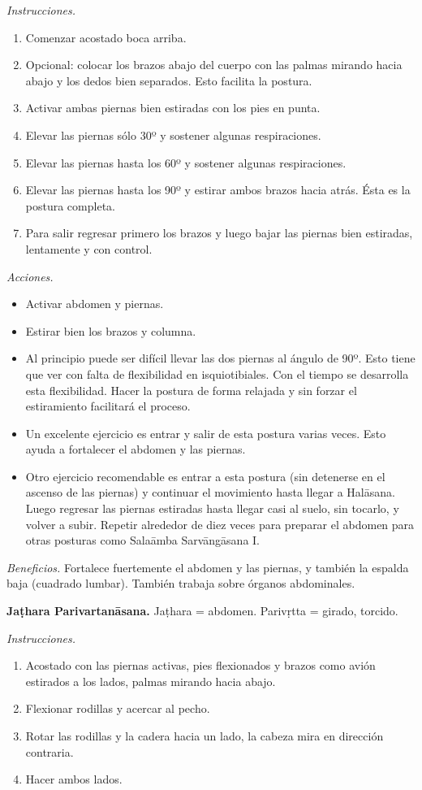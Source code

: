 \emph{Instrucciones.}
\begin{enumerate}
\item Comenzar acostado boca arriba.
\item Opcional: colocar los brazos abajo del
cuerpo con las palmas mirando hacia abajo y
los dedos bien separados. Esto facilita la
postura.
\item Activar ambas piernas bien estiradas
con los pies en punta.
\item Elevar las piernas sólo 30º y sostener
algunas respiraciones.
\item Elevar las piernas hasta los 60º y
sostener algunas respiraciones.
\item Elevar las piernas hasta los 90º y
estirar ambos brazos hacia atrás. Ésta es la
postura completa.
\item Para salir regresar primero los brazos
y luego bajar las piernas bien estiradas,
lentamente y con control.
\end{enumerate}

\emph{Acciones.}
\begin{itemize}
\item Activar abdomen y piernas.
\item Estirar bien los brazos y columna.
\item Al principio puede ser difícil llevar
las dos piernas al ángulo de 90º. Esto tiene
que ver con falta de flexibilidad en
isquiotibiales. Con el tiempo se desarrolla
esta flexibilidad. Hacer la postura de forma
relajada y sin forzar el estiramiento
facilitará el proceso.
\item Un excelente ejercicio es entrar y
salir de esta postura varias veces. Esto
ayuda a fortalecer el abdomen y las piernas.
\item Otro ejercicio recomendable es entrar a
esta postura (sin detenerse en el ascenso de
las piernas) y continuar el movimiento hasta
llegar a Halāsana. Luego regresar las piernas
estiradas hasta llegar casi al suelo, sin
tocarlo, y volver a subir. Repetir alrededor
de diez veces para preparar el abdomen para
otras posturas como Salaāmba Sarvāngāsana I.
\end{itemize}

\emph{Beneficios.} Fortalece fuertemente el
abdomen y las piernas, y también la espalda
baja (cuadrado lumbar). También trabaja sobre
órganos abdominales.

\medskip\noindent\textbf{Jaṭhara
Parivartanāsana.}
Jaṭhara = abdomen. Parivṛtta = girado,
torcido.

\emph{Instrucciones.}
\begin{enumerate}
\item Acostado con las piernas activas, pies
flexionados y brazos como avión estirados a
los lados, palmas mirando hacia abajo.
\item Flexionar rodillas y acercar al pecho.
\item Rotar las rodillas y la cadera hacia un
lado, la cabeza mira en dirección contraria.
\item Hacer ambos lados.
\end{enumerate}

